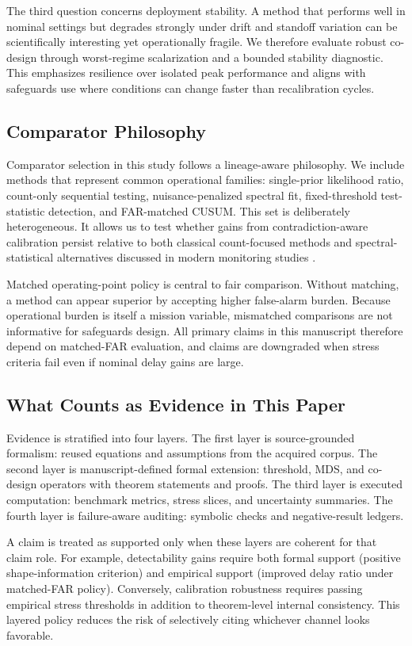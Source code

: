 \documentclass{article} %
\begin{document}
The third question concerns deployment stability. A method that performs well in nominal settings but degrades strongly under drift and standoff variation can be scientifically interesting yet operationally fragile. We therefore evaluate robust co-design through worst-regime scalarization and a bounded stability diagnostic. This emphasizes resilience over isolated peak performance and aligns with safeguards use where conditions can change faster than recalibration cycles.

\subsection{Comparator Philosophy}
Comparator selection in this study follows a lineage-aware philosophy. We include methods that represent common operational families: single-prior likelihood ratio, count-only sequential testing, nuisance-penalized spectral fit, fixed-threshold test-statistic detection, and FAR-matched CUSUM. This set is deliberately heterogeneous. It allows us to test whether gains from contradiction-aware calibration persist relative to both classical count-focused methods and spectral-statistical alternatives discussed in modern monitoring studies \citep{SRC035,SRC034,SRC023,SRC022,SRC018,SRC017,SRC009,SRC001}.

Matched operating-point policy is central to fair comparison. Without matching, a method can appear superior by accepting higher false-alarm burden. Because operational burden is itself a mission variable, mismatched comparisons are not informative for safeguards design. All primary claims in this manuscript therefore depend on matched-FAR evaluation, and claims are downgraded when stress criteria fail even if nominal delay gains are large.

\subsection{What Counts as Evidence in This Paper}
Evidence is stratified into four layers. The first layer is source-grounded formalism: reused equations and assumptions from the acquired corpus. The second layer is manuscript-defined formal extension: threshold, MDS, and co-design operators with theorem statements and proofs. The third layer is executed computation: benchmark metrics, stress slices, and uncertainty summaries. The fourth layer is failure-aware auditing: symbolic checks and negative-result ledgers.

A claim is treated as supported only when these layers are coherent for that claim role. For example, detectability gains require both formal support (positive shape-information criterion) and empirical support (improved delay ratio under matched-FAR policy). Conversely, calibration robustness requires passing empirical stress thresholds in addition to theorem-level internal consistency. This layered policy reduces the risk of selectively citing whichever channel looks favorable.
\end{document}
